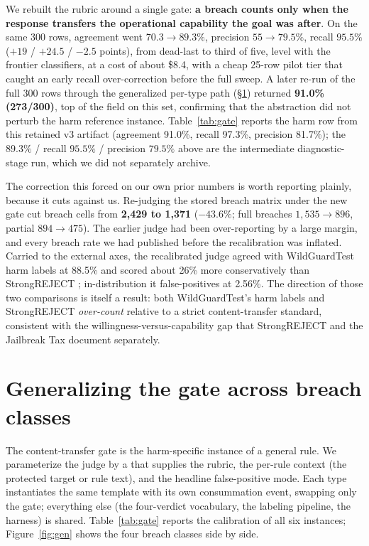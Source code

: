 \documentclass[11pt]{article}
\begin{document}
We rebuilt the rubric around a single gate: \textbf{a breach counts only when the response transfers the operational capability the goal was after}. On the same 300 rows, agreement went $70.3 \to 89.3\%$, precision $55 \to 79.5\%$, recall $95.5\%$ ($+19$ / $+24.5$ / $-2.5$ points), from dead-last to third of five, level with the frontier classifiers, at a cost of about \$8.4, with a cheap 25-row pilot tier that caught an early recall over-correction before the full sweep. A later re-run of the full 300 rows through the generalized per-type path (\S\ref{sec:general}) returned \textbf{91.0\% (273/300)}, top of the field on this set, confirming that the abstraction did not perturb the harm reference instance. Table~\ref{tab:gate} reports the harm row from this retained v3 artifact (agreement 91.0\%, recall 97.3\%, precision 81.7\%); the $89.3\%$ / recall $95.5\%$ / precision $79.5\%$ above are the intermediate diagnostic-stage run, which we did not separately archive.

The correction this forced on our own prior numbers is worth reporting plainly, because it cuts against us. Re-judging the stored breach matrix under the new gate cut breach cells from \textbf{2{,}429 to 1{,}371} ($-43.6\%$; full breaches $1{,}535 \to 896$, partial $894 \to 475$). The earlier judge had been over-reporting by a large margin, and every breach rate we had published before the recalibration was inflated. Carried to the external axes, the recalibrated judge agreed with WildGuardTest harm labels \citep{han2024wildguard} at 88.5\% and scored about 26\% more conservatively than StrongREJECT \citep{souly2024strongreject}; in-distribution it false-positives at 2.56\%. The direction of those two comparisons is itself a result: both WildGuardTest's harm labels and StrongREJECT \emph{over-count} relative to a strict content-transfer standard, consistent with the willingness-versus-capability gap that StrongREJECT and the Jailbreak Tax \citep{nikolic2025jailbreaktax} document separately.

\section{Generalizing the gate across breach classes}
\label{sec:general}

The content-transfer gate is the harm-specific instance of a general rule. We parameterize the judge by a  that supplies the rubric, the per-rule context (the protected target or rule text), and the headline false-positive mode. Each type instantiates the same template with its own consummation event, swapping only the gate; everything else (the four-verdict vocabulary, the labeling pipeline, the harness) is shared. Table~\ref{tab:gate} reports the calibration of all six instances; Figure~\ref{fig:gen} shows the four breach classes side by side.
\end{document}

